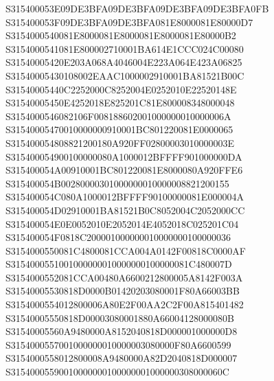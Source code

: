 \documentclass[12pt,a4paper]{article}
\begin{document}
\begin{framed}
{S315400053E09DE3BFA09DE3BFA09DE3BFA09DE3BFA0FB\newline
S315400053F09DE3BFA09DE3BFA081E8000081E80000D7\newline
S3154000540081E8000081E8000081E8000081E80000B2\newline
S3154000541081E800002710001BA614E1CCC024C00080\newline
S31540005420E203A068A4046004E223A064E423A06825\newline
S31540005430108002EAAC1000002910001BA81521B00C\newline
S31540005440C2252000C8252004E0252010E22520148E\newline
S31540005450E4252018E825201C81E800008348000048\newline
S3154000546082106F008188602001000000010000006A\newline
S31540005470010000000910001BC801220081E0000065\newline
S315400054808821200180A920FF02800003010000003E\newline
S315400054900100000080A1000012BFFFF901000000DA\newline
S315400054A00910001BC801220081E8000080A920FFE6\newline
S315400054B00280000301000000010000008821200155\newline
S315400054C080A1000012BFFFF90100000081E000004A\newline
S315400054D02910001BA81521B0C8052004C2052000CC\newline
S315400054E0E0052010E2052014E4052018C025201C04\newline
S315400054F0818C200001000000010000000100000036\newline
S3154000550081C4800081CCA004A0142F00818C0000AF\newline
S3154000551001000000010000000100000081C480007D\newline
S3154000552081CCA00480A6600212800005A8142F003A\newline
S31540005530818D0000B01420203080001F80A66003BB\newline
S3154000554012800006A80E2F00AA2C2F00A815401482\newline
S31540005550818D00003080001880A66004128000080B\newline
S31540005560A9480000A8152040818D000001000000D8\newline
S3154000557001000000010000003080000F80A6600599\newline
S3154000558012800008A9480000A82D2040818D000007\newline
S31540005590010000000100000001000000308000060C\newline
}
\end{framed}
\end{document}
